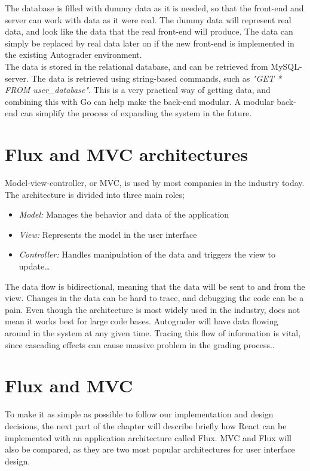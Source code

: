 The database is filled with dummy data as it is needed, so that the front-end and server can work with data as it were real. The dummy data will represent real data, and look like the data that the real front-end will produce. The data can simply be replaced by real data later on if the new front-end is implemented in the existing Autograder environment.
\\The data is stored in the relational database, and can be retrieved from MySQL-server. The data is retrieved using string-based commands, such as \emph{"GET * FROM user\_database"}. This is a very practical way of getting data, and combining this with Go can help make the back-end modular. A modular back-end can simplify the process of expanding the system in the future.

\section{Flux and MVC architectures}
Model-view-controller, or MVC, is used by most companies in the industry today. The architecture is divided into three main roles;

\begin{itemize}  
\item \emph{Model:} Manages the behavior and data of the application
\item \emph{View:} Represents the model in the user interface
\item \emph{Controller:} Handles manipulation of the data and triggers the view to update\ldots 
\end{itemize}

The data flow is bidirectional, meaning that the data will be sent to and from the view. Changes in the data can be hard to trace, and debugging the code can be a pain. Even though the architecture is most widely used in the industry, does not mean it works best for large code bases. Autograder will have data flowing around in the system at any given time. Tracing this flow of information is vital, since cascading effects can cause massive problem in the grading process.. 

\section{Flux and MVC}\label{sec:fluxmvc}
To make it as simple as possible to follow our implementation and design decisions, the next part of the chapter will describe briefly how React can be implemented with an application architecture called Flux. MVC and Flux will also be compared, as they are two most popular architectures for user interface design.

